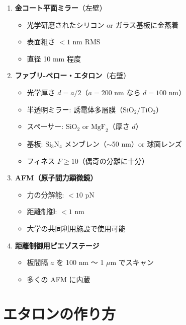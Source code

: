 \documentclass[12pt,a4paper]{article}
\begin{document}
\begin{expbox}[装置リスト]
\begin{enumerate}
\item \textbf{金コート平面ミラー}（左壁）
    \begin{itemize}
    \item 光学研磨されたシリコン or ガラス基板に金蒸着
    \item 表面粗さ $< 1$ nm RMS
    \item 直径 10 mm 程度
    \end{itemize}

\item \textbf{ファブリ-ペロー・エタロン}（右壁）
    \begin{itemize}
    \item 光学厚さ $d = a/2$（$a = 200$ nm なら $d = 100$ nm）
    \item 半透明ミラー: 誘電体多層膜（$\text{SiO}_2/\text{TiO}_2$）
    \item スペーサー: $\text{SiO}_2$ or $\text{MgF}_2$（厚さ $d$）
    \item 基板: $\text{Si}_3\text{N}_4$ メンブレン（$\sim$50 nm）or 球面レンズ
    \item フィネス $F \geq 10$（偶奇の分離に十分）
    \end{itemize}

\item \textbf{AFM（原子間力顕微鏡）}
    \begin{itemize}
    \item 力の分解能: $< 10$ pN
    \item 距離制御: $< 1$ nm
    \item 大学の共同利用施設で使用可能
    \end{itemize}

\item \textbf{距離制御用ピエゾステージ}
    \begin{itemize}
    \item 板間隔 $a$ を 100 nm 〜 1 $\mu$m でスキャン
    \item 多くの AFM に内蔵
    \end{itemize}
\end{enumerate}
\end{expbox}

\section{エタロンの作り方}
\end{document}
